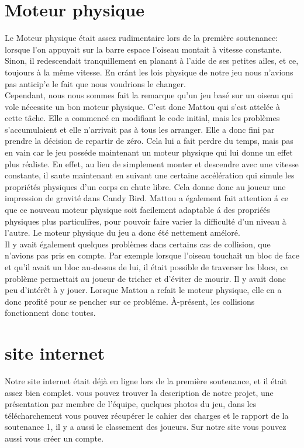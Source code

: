 \documentclass [11pt]{report}
\begin{document}
	\section{Moteur physique}
		Le Moteur physique \'etait assez rudimentaire lors de la premi\`ere soutenance: lorsque l'on appuyait sur la barre espace l'oiseau montait \`a vitesse constante. Sinon, il redescendait tranquillement en planant \`a l'aide de ses petites ailes, et ce, toujours \`a la m\^eme vitesse. En cr\'ant les lois physique de notre jeu nous n'avions pas anticip'e le fait que nous voudrions le changer.\\
		\indent Cependant, nous nous sommes fait la remarque qu'un jeu bas\'e sur un oiseau qui vole n\'ecessite un bon moteur physique. C'est donc Mattou qui s'est attel\'ee \`a cette t\^ache. Elle a commenc\'e en modifiant le code initial, mais les probl\`emes s'accumulaient et elle n'arrivait pas \`a tous les arranger. Elle a donc fini par prendre la d\'ecision de repartir de z\'ero. Cela lui a fait perdre du temps, mais pas en vain car le jeu poss\'ede maintenant un moteur physique qui lui donne un effet plus r\'ealiste. En effet, au lieu de simplement monter et descendre avec une vitesse constante, il saute maintenant en suivant une certaine acc\'el\'eration qui simule les propri\'et\'es physiques d'un corps en chute libre. Cela donne donc au joueur une impression de gravit\'e dans Candy Bird. Mattou a \'egalement fait attention \'a ce que ce nouveau moteur physique soit facilement adaptable \'a des propri\'e\'es physiques plus particuli\`res, pour pouvoir faire varier la difficult\'e d'un niveau \`a l'autre. Le moteur physique du jeu a donc \'et\'e nettement am\'elor\'e. \\
		\indent Il y avait \'egalement quelques probl\`emes dans certains cas de collision, que n'avions pas pris en compte. Par exemple lorsque l'oiseau touchait un bloc de face et qu'il avait un bloc au-dessus de lui, il \'etait possible de traverser les blocs, ce probl\`eme permettait au joueur de tricher et d'\'eviter de mourir. Il y avait donc peu d'int\'er\^et \`a y jouer. Lorsque Mattou a refait le moteur physique, elle en a donc profit\'e pour se pencher sur ce probl\'eme. \`A-pr\'esent, les collisions fonctionnent donc toutes. 
	\section{site internet}
		Notre site internet \'etait d\'ej\`a en ligne lors de la premi\`ere soutenance, et il \'etait assez bien complet. vous pouvez trouver la description de notre projet, une pr\'esentation par membre de l'\'equipe, quelques photos du jeu, dans les t\'el\'echarchement vous pouvez r\'ecup\'erer le cahier des charges et le rapport de la soutenance 1, il y a aussi le classement des joueurs. Sur notre site vous pouvez aussi vous cr\'eer un compte.
\end{document}

